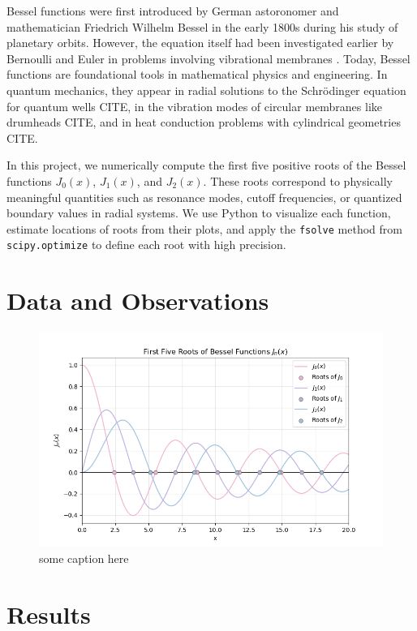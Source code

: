 \documentclass[linenumbers, RNAAS, trackchanges]{aastex631}
\begin{document}
\noindent Bessel functions were first introduced by German astoronomer and
mathematician Friedrich Wilhelm Bessel in the early 1800s during his study of
planetary orbits. However, the equation itself had been investigated earlier
by Bernoulli and Euler in problems involving vibrational membranes
\citet{abramowitz_stegun}. Today, Bessel functions are foundational tools in 
mathematical physics and engineering. In quantum mechanics, they appear in 
radial solutions to the Schrödinger equation for quantum wells CITE, in the 
vibration modes of circular membranes like drumheads CITE, and in heat 
conduction problems with cylindrical geometries CITE.

\noindent In this project, we numerically compute the first five positive roots
of the Bessel functions $J_0(x)$, $J_1(x)$, and $J_2(x)$. These roots correspond
to physically meaningful quantities such as resonance modes, cutoff frequencies, 
or quantized boundary values in radial systems. We use Python to visualize each
function, estimate locations of roots from their plots, and apply the \texttt{fsolve}
method from \texttt{scipy.optimize} to define each root with high precision.



\section{Data and Observations} \label{sec:data}

\begin{figure}[H]
    \centering
    \includegraphics[width=0.70\linewidth]{bessel_roots.png}
    \caption{some caption here}
    \label{fig:bessel_roots}
\end{figure}

\section{Results} \label{sec:results}
\end{document}
